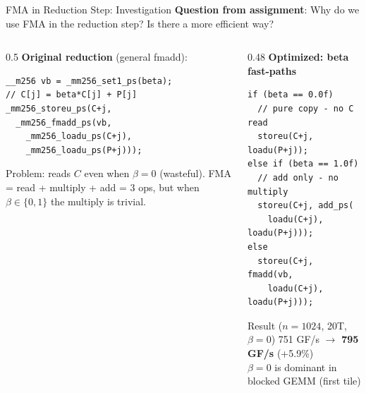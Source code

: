 \documentclass[aspectratio=169,10pt]{beamer}
\begin{document}
\begin{frame}[fragile]{FMA in Reduction Step: Investigation}
  \textbf{Question from assignment}: Why do we use FMA in the reduction step? Is there a more efficient way?

  \begin{columns}[T]
    \begin{column}{0.5\textwidth}
      \textbf{Original reduction} (general fmadd):
      \begin{lstlisting}
__m256 vb = _mm256_set1_ps(beta);
// C[j] = beta*C[j] + P[j]
_mm256_storeu_ps(C+j,
  _mm256_fmadd_ps(vb,
    _mm256_loadu_ps(C+j),
    _mm256_loadu_ps(P+j)));
      \end{lstlisting}
      \alert{Problem}: reads $C$ even when $\beta=0$ (wasteful). FMA = read + multiply + add = 3 ops, but when $\beta \in \{0,1\}$ the multiply is trivial.
    \end{column}
    \begin{column}{0.48\textwidth}
      \textbf{Optimized: beta fast-paths}
      \begin{lstlisting}
if (beta == 0.0f)
  // pure copy - no C read
  storeu(C+j, loadu(P+j));
else if (beta == 1.0f)
  // add only - no multiply
  storeu(C+j, add_ps(
    loadu(C+j), loadu(P+j)));
else
  storeu(C+j, fmadd(vb,
    loadu(C+j), loadu(P+j)));
      \end{lstlisting}
      \begin{exampleblock}{Result ($n=1024$, 20T, $\beta=0$)}
        \scriptsize 751 GF/s $\to$ \textbf{795 GF/s} (+5.9\%)\\
        $\beta=0$ is dominant in blocked GEMM (first tile)
      \end{exampleblock}
    \end{column}
  \end{columns}
\end{frame}
\end{document}

